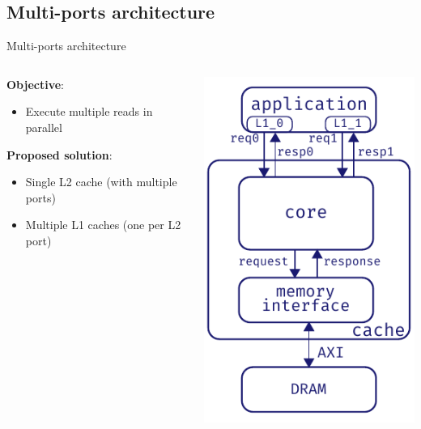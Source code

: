 \documentclass[aspectratio=169]{beamer}
\begin{document}
\subsection{Multi-ports architecture}
\begin{frame}{Multi-ports architecture}
	\begin{columns}[c]
		\begin{column}{.55\textwidth}
			\textbf{Objective}:
			\begin{itemize}
				\item Execute multiple reads in parallel
			\end{itemize}

			\bigskip
			\textbf{Proposed solution}:
			\begin{itemize}
				\item Single L2 cache (with multiple ports)
				\item Multiple L1 caches (one per L2 port)
			\end{itemize}
		\end{column}
		\begin{column}{.5\textwidth}
			\begin{center}
			\includegraphics[height=.7\textheight]{multi_ports_arch}
			\end{center}
		\end{column}
	\end{columns}
\end{frame}
\end{document}

